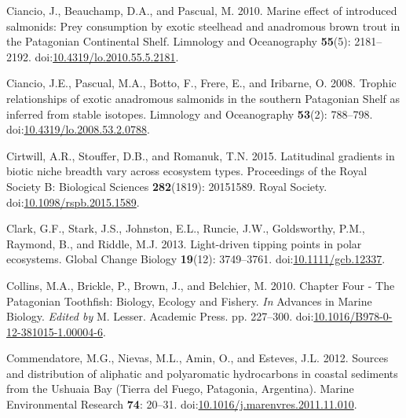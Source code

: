 \documentclass[
]{article}
\newlength{\cslhangindent}
\newenvironment{CSLReferences}[2] %
 {\begin{list}{}{%
  \setlength{\itemindent}{0pt}
  \setlength{\leftmargin}{0pt}
  \setlength{\parsep}{0pt}
  \ifodd #1
   \setlength{\leftmargin}{\cslhangindent}
   \setlength{\itemindent}{-1\cslhangindent}
  \fi
  \setlength{\itemsep}{#2\baselineskip}}}
 {\end{list}}
\begin{document}
\begin{CSLReferences}{1}{0}
Ciancio, J., Beauchamp, D.A., and Pascual, M. 2010. Marine effect of
introduced salmonids: {Prey} consumption by exotic steelhead and
anadromous brown trout in the {Patagonian Continental Shelf}. Limnology
and Oceanography \textbf{55}(5): 2181--2192.
doi:\href{https://doi.org/10.4319/lo.2010.55.5.2181}{10.4319/lo.2010.55.5.2181}.

Ciancio, J.E., Pascual, M.A., Botto, F., Frere, E., and Iribarne, O.
2008. Trophic relationships of exotic anadromous salmonids in the
southern {Patagonian Shelf} as inferred from stable isotopes. Limnology
and Oceanography \textbf{53}(2): 788--798.
doi:\href{https://doi.org/10.4319/lo.2008.53.2.0788}{10.4319/lo.2008.53.2.0788}.

Cirtwill, A.R., Stouffer, D.B., and Romanuk, T.N. 2015. Latitudinal
gradients in biotic niche breadth vary across ecosystem types.
Proceedings of the Royal Society B: Biological Sciences
\textbf{282}(1819): 20151589. Royal Society.
doi:\href{https://doi.org/10.1098/rspb.2015.1589}{10.1098/rspb.2015.1589}.

Clark, G.F., Stark, J.S., Johnston, E.L., Runcie, J.W., Goldsworthy,
P.M., Raymond, B., and Riddle, M.J. 2013. Light-driven tipping points in
polar ecosystems. Global Change Biology \textbf{19}(12): 3749--3761.
doi:\href{https://doi.org/10.1111/gcb.12337}{10.1111/gcb.12337}.

Collins, M.A., Brickle, P., Brown, J., and Belchier, M. 2010. Chapter
{Four} - {The Patagonian Toothfish}: {Biology}, {Ecology} and {Fishery}.
\emph{In} Advances in {Marine Biology}. \emph{Edited by} M. Lesser.
Academic Press. pp. 227--300.
doi:\href{https://doi.org/10.1016/B978-0-12-381015-1.00004-6}{10.1016/B978-0-12-381015-1.00004-6}.

Commendatore, M.G., Nievas, M.L., Amin, O., and Esteves, J.L. 2012.
Sources and distribution of aliphatic and polyaromatic hydrocarbons in
coastal sediments from the {Ushuaia Bay} ({Tierra} del {Fuego},
{Patagonia}, {Argentina}). Marine Environmental Research \textbf{74}:
20--31.
doi:\href{https://doi.org/10.1016/j.marenvres.2011.11.010}{10.1016/j.marenvres.2011.11.010}.


\end{CSLReferences}
\end{document}
